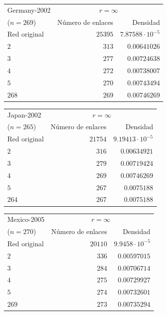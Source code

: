 \documentclass[10pt,a4paper,spanish]{article}
\numberwithin{equation}{section} %
\numberwithin{figure}{section} %
\numberwithin{table}{section} %
\begin{document}
\begin{tabular}{lrr}
\hline
 Germany-2002 & \multicolumn{2}{c}{$r = \infty$} \\
($n=269$)   &   Número de enlaces &    Densidad \\
\hline
 Red original               &               $25395$ & $7.87588 \cdot 10^{-5}$ \\
 $2$                          &                 $313$ & $0.00641026$  \\
 $3$                          &                 $277$ & $0.00724638$  \\
 $4$                          &                 $272$ & $0.00738007$  \\
 $5$                          &                 $270$ & $0.00743494$  \\
 $268$                        &                 $269$ & $0.00746269$  \\
\hline
\end{tabular}


\begin{tabular}{lrr}
\hline
 Japan-2002 & \multicolumn{2}{c}{$r = \infty$} \\
($n=265$)   &   Número de enlaces &    Densidad \\
\hline
 Red original             &               $21754$ & $9.19413 \cdot 10^{-5}$ \\
 $2$                        &                 $316$ & $0.00634921$  \\
 $3$                        &                 $279$ & $0.00719424$  \\
 $4$                        &                 $269$ & $0.00746269$  \\
 $5$                        &                 $267$ & $0.0075188$   \\
 $264$                      &                 $267$ & $0.0075188$   \\
\hline
\end{tabular}


\begin{tabular}{lrr}
\hline
 Mexico-2005 & \multicolumn{2}{c}{$r = \infty$} \\
($n=270$)   &   Número de enlaces &   Densidad \\
\hline
 Red original              &               $20110$ & $9.9458 \cdot 10^{-5}$ \\
 $2$                         &                 $336$ & $0.00597015$ \\
 $3$                         &                 $284$ & $0.00706714$ \\
 $4$                         &                 $275$ & $0.00729927$ \\
 $5$                         &                 $274$ & $0.00732601$ \\
 $269$                       &                 $273$ & $0.00735294$ \\
\hline
\end{tabular}
\end{document}
